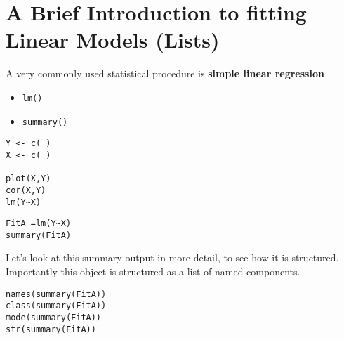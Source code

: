 \documentclass[a4paper,12pt]{article}
\begin{document}






\section{A Brief Introduction to fitting Linear Models (Lists)}

A very commonly used statistical procedure is \textbf{simple linear regression}
\begin{itemize}
\item \texttt{lm()}
\item \texttt{summary()}
\end{itemize}

\begin{framed}
\begin{verbatim}
Y <- c( )
X <- c( )

plot(X,Y)
cor(X,Y)
lm(Y~X)
\end{verbatim}
\end{framed}
\begin{framed}
\begin{verbatim}
FitA =lm(Y~X)
summary(FitA)
\end{verbatim}
\end{framed}
Let's look at this summary output in more detail, to see how it is structured. Importantly this object is structured as a list of named components.
\begin{framed}
\begin{verbatim}
names(summary(FitA))
class(summary(FitA))
mode(summary(FitA))
str(summary(FitA))
\end{verbatim}
\end{framed}
\end{document}
